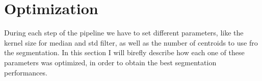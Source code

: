 \documentclass{standalone}
\begin{document}
	\section{Optimization}
	
	During each step of the pipeline we have to set different parameters, like the kernel size for median and std filter, as well as the number of centroids to use fro the segmentation. In this section I will birefly describe how each one of these parameters was optimized, in order to obtain the best segmentation performances.
\end{document}
